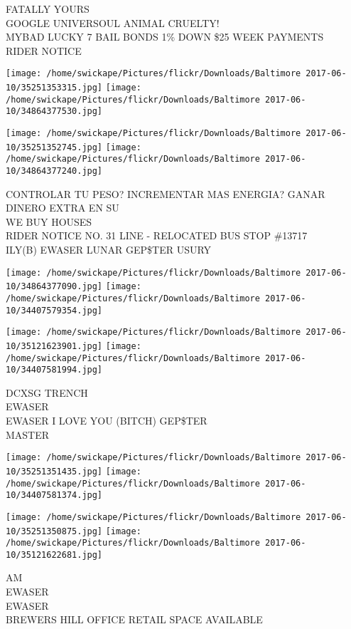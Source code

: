 \documentclass[10pt,letterpaper]{article}
\begin{document}
FATALLY YOURS\\
GOOGLE UNIVERSOUL ANIMAL CRUELTY!\\
MYBAD LUCKY 7 BAIL BONDS 1\% DOWN \$25 WEEK PAYMENTS\\
RIDER NOTICE\\
\pagebreak

\texttt{[image: /home/swickape/Pictures/flickr/Downloads/Baltimore 2017-06-10/35251353315.jpg]}
\texttt{[image: /home/swickape/Pictures/flickr/Downloads/Baltimore 2017-06-10/34864377530.jpg]}

\texttt{[image: /home/swickape/Pictures/flickr/Downloads/Baltimore 2017-06-10/35251352745.jpg]}
\texttt{[image: /home/swickape/Pictures/flickr/Downloads/Baltimore 2017-06-10/34864377240.jpg]}

CONTROLAR TU PESO? INCREMENTAR MAS ENERGIA? GANAR DINERO EXTRA EN SU\\
WE BUY HOUSES\\
RIDER NOTICE NO. 31 LINE {-} RELOCATED BUS STOP \#13717\\
ILY(B) EWASER LUNAR GEP\$TER USURY\\
\pagebreak

\texttt{[image: /home/swickape/Pictures/flickr/Downloads/Baltimore 2017-06-10/34864377090.jpg]}
\texttt{[image: /home/swickape/Pictures/flickr/Downloads/Baltimore 2017-06-10/34407579354.jpg]}

\texttt{[image: /home/swickape/Pictures/flickr/Downloads/Baltimore 2017-06-10/35121623901.jpg]}
\texttt{[image: /home/swickape/Pictures/flickr/Downloads/Baltimore 2017-06-10/34407581994.jpg]}

DCXSG TRENCH\\
EWASER\\
EWASER I LOVE YOU (BITCH) GEP\$TER\\
MASTER\\
\pagebreak

\texttt{[image: /home/swickape/Pictures/flickr/Downloads/Baltimore 2017-06-10/35251351435.jpg]}
\texttt{[image: /home/swickape/Pictures/flickr/Downloads/Baltimore 2017-06-10/34407581374.jpg]}

\texttt{[image: /home/swickape/Pictures/flickr/Downloads/Baltimore 2017-06-10/35251350875.jpg]}
\texttt{[image: /home/swickape/Pictures/flickr/Downloads/Baltimore 2017-06-10/35121622681.jpg]}

AM\\
EWASER\\
EWASER\\
BREWERS HILL OFFICE RETAIL SPACE AVAILABLE\\
\pagebreak
\end{document}
